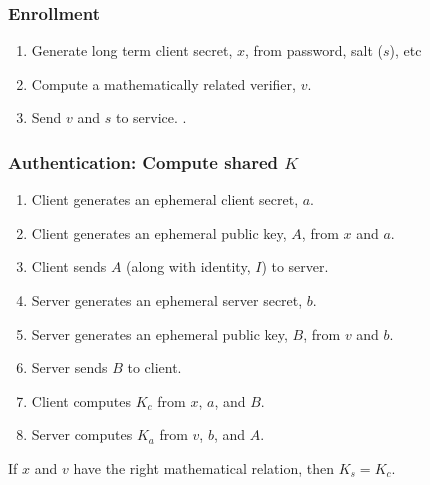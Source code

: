 \documentclass[xcolor={dvipsnames,table,hyperref}]{beamer}
\begin{document}
\begin{frame}
  \frametitle{Enrollment}
  \begin{enumerate}
    \item Generate long term client secret, $x$, from password, salt ($s$), etc
    \item Compute a mathematically related verifier, $v$.
    \item Send $v$ and $s$ to service.
      .
  \end{enumerate}
\end{frame}

\begin{frame}
  \frametitle{Authentication: Compute shared $K$}
  \begin{enumerate}
    \item Client generates an ephemeral client secret, $a$.
    \item Client generates an ephemeral public key, $A$, from $x$ and $a$.
    \item Client sends $A$ (along with identity, $I$) to server.
    \item Server generates an ephemeral server secret, $b$.
    \item Server generates an ephemeral public key, $B$, from $v$ and $b$.
    \item Server sends $B$ to client.
    \item Client computes $K_c$ from $x$, $a$, and $B$.
    \item Server computes $K_a$ from $v$, $b$, and $A$.
  \end{enumerate}
  If $x$ and $v$ have the right mathematical relation, then $K_s = K_c$.


\end{frame}
\end{document}
